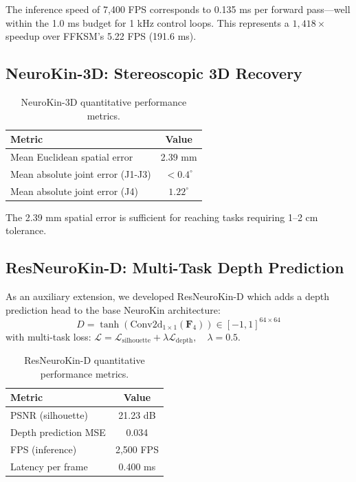 \documentclass[12pt,a4paper,oneside]{report}
\begin{document}
The inference speed of 7,400 FPS corresponds to 0.135 ms per forward pass---well within the 1.0 ms budget for 1 kHz control loops. This represents a $1,418\times$ speedup over FFKSM's 5.22 FPS (191.6 ms).

\subsection{NeuroKin-3D: Stereoscopic 3D Recovery}

\begin{table}[H]
\centering
\caption{NeuroKin-3D quantitative performance metrics.}
\label{tab:neurokin3d_performance}
\begin{tabular}{lc}
\toprule
Metric & Value \\
\midrule
Mean Euclidean spatial error & 2.39 mm \\
Mean absolute joint error (J1-J3) & $<0.4^\circ$ \\
Mean absolute joint error (J4) & $1.22^\circ$ \\
\bottomrule
\end{tabular}
\end{table}

The 2.39 mm spatial error is sufficient for reaching tasks requiring 1--2 cm tolerance.

\subsection{ResNeuroKin-D: Multi-Task Depth Prediction}

As an auxiliary extension, we developed ResNeuroKin-D which adds a depth prediction head to the base NeuroKin architecture:
\begin{equation}
\hat{D} = \tanh(\text{Conv2d}_{1\times1}(\mathbf{F}_4)) \in [-1, 1]^{64 \times 64}
\end{equation}
with multi-task loss: $\mathcal{L} = \mathcal{L}_{\text{silhouette}} + \lambda \mathcal{L}_{\text{depth}}, \quad \lambda = 0.5$.

\begin{table}[H]
\centering
\caption{ResNeuroKin-D quantitative performance metrics.}
\label{tab:resneurokin_performance}
\begin{tabular}{lc}
\toprule
Metric & Value \\
\midrule
PSNR (silhouette) & 21.23 dB \\
Depth prediction MSE & 0.034 \\
FPS (inference) & 2,500 FPS \\
Latency per frame & 0.400 ms \\
\bottomrule
\end{tabular}
\end{table}
\end{document}

